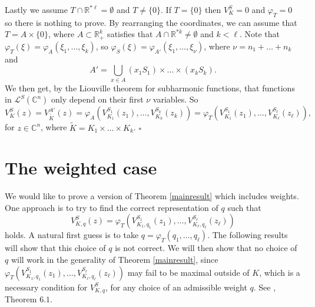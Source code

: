 \documentclass[a4paper,12pt,leqno,english]{article}
\numberwithin{equation}{section}
\newenvironment{prooftx}[1]{\medbreak\noindent{\bf 
    #1:}\rm}{\hfill$\square$\rm}
\begin{document}
\begin{prooftx}{Proof of Theorem \ref{mainresult}}
Lastly we assume $T \cap \mathbb{R}^{*\ell} = \emptyset$ and $T \neq \{0\}$.
If $T = \{0\}$ then $V^S_K = 0$ and $\varphi_T = 0$ so there is nothing to prove.
By rearranging the coordinates, we can assume that $T = A \times \{0\}$,
    where $A \subset \mathbb{R}_+^k$ satisfies that $A \cap \mathbb{R}^{*k} \neq \emptyset$ and $k < \ell$.
Note that $\varphi_T(\xi) = \varphi_A(\xi_1, \dots, \xi_k)$, so
    $\varphi_S(\xi) = \varphi_{A'}(\xi_1, \dots, \xi_\nu)$, where $\nu = n_1 + \dots + n_k$ and
\begin{equation*}
    A'
    =
    \bigcup_{x \in A} (x_1 S_1) \times \dots \times (x_k S_k).
\end{equation*}
We then get, by the Liouville theorem for subharmonic functions, that functions in $\mathcal{L}^S(\mathbb{C}^n)$
    only depend on their first $\nu$ variables.
So
\begin{equation*}
    V^S_K(z)
    =
    V^{A'}_{\tilde{K}}(z)
    =
    \varphi_A(V^{S_1}_{K_1}(z_1), \dots, V^{S_k}_{K_k}(z_k))
    =
    \varphi_T(V^{S_1}_{K_1}(z_1), \dots, V^{S_\ell}_{K_\ell}(z_\ell)),
\end{equation*}
for $z \in \mathbb{C}^n$, where $\tilde{K} = K_1 \times \dots \times K_k$.
\end{prooftx}




































\section{The weighted case}
We would like to prove a version of Theorem \ref{mainresult} which includes weights.
One approach is to try to find the correct representation of $q$ such that
\begin{equation*}
    V^S_{K, q}(z)
    =
    \varphi_T(V^{S_1}_{K_1, q_1}(z_1), \dots, V^{S_\ell}_{K_\ell, q_\ell}(z_\ell))
\end{equation*}
holds.
A natural first guess is to take $q = \varphi_T(q_1, \dots, q_\ell)$.
The following results will show that this choice of $q$ is not correct.
We will then show that no choice of $q$ will work in the generality of Theorem \ref{mainresult}, since 
    $\varphi_T(V^{S_1}_{K_1, q_1}(z_1), \dots, V^{S_\ell}_{K_\ell, q_\ell}(z_\ell))$ may fail to be maximal outside of $K$,
    which is a necessary condition for $V^S_{K, q}$, for any choice of an admissible weight $q$.
See \cite{MagSigSigSno:2023}, Theorem $6.1$.
\end{document}
